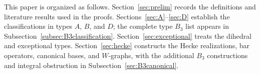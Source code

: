 \documentclass[11pt]{article}
\numberwithin{equation}{section}
\theoremstyle{definition}
\DeclareMathOperator{\Lin}{Lin}
\begin{document}
%

This paper is organized as follows.
Section~\ref{sec:prelim} records the definitions and literature results used in the proofs.
Sections~\ref{sec:A}--\ref{sec:D} establish the classifications in types \(A\), \(B\), and \(D\); the complete type \(B_3\) list appears in Subsection~\ref{subsec:B3classification}.
Section~\ref{sec:exceptional} treats the dihedral and exceptional types.
Section~\ref{sec:hecke} constructs the Hecke realizations, bar operators, canonical bases, and \(W\)-graphs, with the additional \(B_3\) constructions and integral obstruction in Subsection~\ref{sec:B3canonical}.
\end{document}
